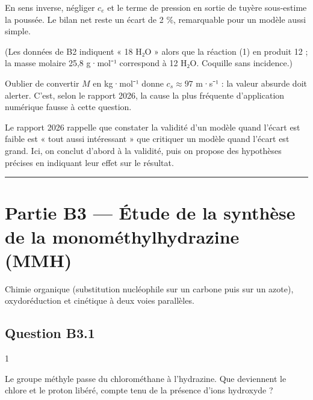 \documentclass[11pt,a4paper]{article}
\begin{document}
En sens inverse, négliger \(c_e\) et le terme de pression en sortie de tuyère sous-estime la poussée. Le bilan net reste un écart de 2 \%, remarquable pour un modèle aussi simple.

(Les données de B2 indiquent « 18 H₂O » alors que la réaction (1) en produit 12 ; la masse molaire 25,8 g·mol⁻¹ correspond à 12 H₂O. Coquille sans incidence.)

\begin{piege}

Oublier de convertir \(M\) en kg·mol⁻¹ donne \(c_s \approx 97\) m·s⁻¹ : la valeur absurde doit alerter. C'est, selon le rapport 2026, la cause la plus fréquente d'application numérique fausse à cette question.

\end{piege}

\begin{jury}

Le rapport 2026 rappelle que constater la validité d'un modèle quand l'écart est faible est « tout aussi intéressant » que critiquer un modèle quand l'écart est grand. Ici, on conclut d'abord à la validité, puis on propose des hypothèses précises en indiquant leur effet sur le résultat.

\end{jury}

\begin{center}\rule{0.5\linewidth}{0.5pt}\end{center}

\hypertarget{partie-b3-uxe9tude-de-la-synthuxe8se-de-la-monomuxe9thylhydrazine-mmh}{%
\section{Partie B3 --- Étude de la synthèse de la monométhylhydrazine (MMH)}\label{partie-b3-uxe9tude-de-la-synthuxe8se-de-la-monomuxe9thylhydrazine-mmh}}

Chimie organique (substitution nucléophile sur un carbone puis sur un azote), oxydoréduction et cinétique à deux voies parallèles.

\hypertarget{question-b3.1}{%
\subsection{Question B3.1}\label{question-b3.1}}

\begin{indication}{1}

Le groupe méthyle passe du chlorométhane à l'hydrazine. Que deviennent le chlore et le proton libéré, compte tenu de la présence d'ions hydroxyde ?

\end{indication}
\end{document}
